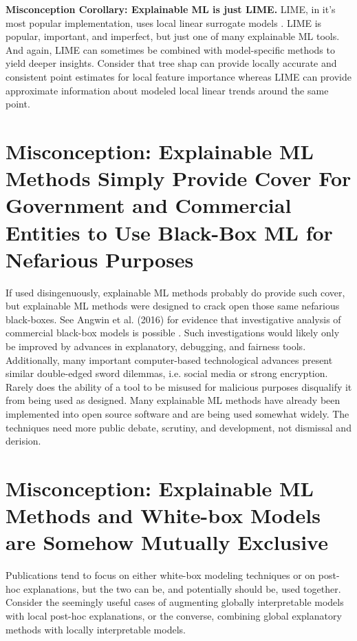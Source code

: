 \documentclass{article}
\begin{document}
\textbf{Misconception Corollary: Explainable ML is just LIME.} LIME, in it's most popular implementation, uses local linear surrogate models \cite{lime}. LIME is popular, important, and imperfect, but just one of many explainable ML tools. And again, LIME can sometimes be combined with model-specific methods to yield deeper insights. Consider that tree shap can provide locally accurate and consistent point estimates for local feature importance whereas LIME can provide approximate information about modeled local linear trends around the same point.   

\section{Misconception: Explainable ML Methods Simply Provide Cover For Government and Commercial Entities to Use Black-Box ML for Nefarious Purposes}

If used disingenuously, explainable ML methods probably do provide such cover, but explainable ML methods were designed to crack open those same nefarious black-boxes. See Angwin et al. (2016) for evidence that investigative analysis of commercial black-box models is possible \cite{angwin16}. Such investigations would likely only be improved by advances in explanatory, debugging, and fairness tools. \\

Additionally, many important computer-based technological advances present similar double-edged sword dilemmas, i.e. social media or strong encryption. Rarely does the ability of a tool to be misused for malicious purposes  disqualify it from being used as designed. Many explainable ML methods have already been implemented into open source software and are being used somewhat widely. The techniques need more public debate, scrutiny, and development, not dismissal and derision.

\section{Misconception: Explainable ML Methods and White-box Models are Somehow Mutually Exclusive}

Publications tend to focus on either white-box modeling techniques or on post-hoc explanations, but the two can be, and potentially should be, used together. Consider the seemingly useful cases of augmenting globally interpretable models with local post-hoc explanations, or the converse, combining global explanatory methods with locally interpretable models.
\end{document}
